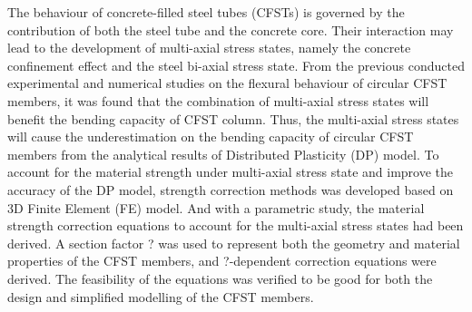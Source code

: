\abstract
The behaviour of concrete-filled steel tubes (CFSTs) is governed by the contribution of both the steel tube and the concrete core. Their interaction may lead to the development of multi-axial stress states, namely the concrete confinement effect and the steel bi-axial stress state. From the previous conducted experimental and numerical studies on the flexural behaviour of circular CFST members, it was found that the combination of multi-axial stress states will benefit the bending capacity of CFST column. Thus, the multi-axial stress states will cause the underestimation on the bending capacity of circular CFST members from the analytical results of Distributed Plasticity (DP) model. To account for the material strength under multi-axial stress state and improve the accuracy of the DP model, strength correction methods was developed based on 3D Finite Element (FE) model. And with a parametric study, the material strength correction equations to account for the multi-axial stress states had been derived. A section factor ? was used to represent both the geometry and material properties of the CFST members, and ?-dependent correction equations were derived. The feasibility of the equations was verified to be good for both the design and simplified modelling of the CFST members.
